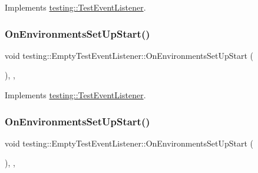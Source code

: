 Implements \mbox{\hyperlink{classtesting_1_1_test_event_listener_aa6502e534919605be45f26a6daf9a40c}{testing\+::\+Test\+Event\+Listener}}.

\mbox{\label{classtesting_1_1_empty_test_event_listener_a6e498ae763ac8c1a46bd861e0b7ff3f5}} 
\subsubsection{\texorpdfstring{OnEnvironmentsSetUpStart()}{OnEnvironmentsSetUpStart()}\hspace{0.1cm}{\footnotesize\ttfamily [2/3]}}
{\footnotesize\ttfamily void testing\+::\+Empty\+Test\+Event\+Listener\+::\+On\+Environments\+Set\+Up\+Start (\begin{DoxyParamCaption}\item[{const \mbox{\hyperlink{classtesting_1_1_unit_test}{Unit\+Test}} \&}]{ }\end{DoxyParamCaption})\hspace{0.3cm}{\ttfamily [inline]}, {\ttfamily [override]}, {\ttfamily [virtual]}}



Implements \mbox{\hyperlink{classtesting_1_1_test_event_listener_aa6502e534919605be45f26a6daf9a40c}{testing\+::\+Test\+Event\+Listener}}.

\mbox{\label{classtesting_1_1_empty_test_event_listener_a6e498ae763ac8c1a46bd861e0b7ff3f5}} 
\subsubsection{\texorpdfstring{OnEnvironmentsSetUpStart()}{OnEnvironmentsSetUpStart()}\hspace{0.1cm}{\footnotesize\ttfamily [3/3]}}
{\footnotesize\ttfamily void testing\+::\+Empty\+Test\+Event\+Listener\+::\+On\+Environments\+Set\+Up\+Start (\begin{DoxyParamCaption}\item[{const \mbox{\hyperlink{classtesting_1_1_unit_test}{Unit\+Test}} \&}]{ }\end{DoxyParamCaption})\hspace{0.3cm}{\ttfamily [inline]}, {\ttfamily [override]}, {\ttfamily [virtual]}}



